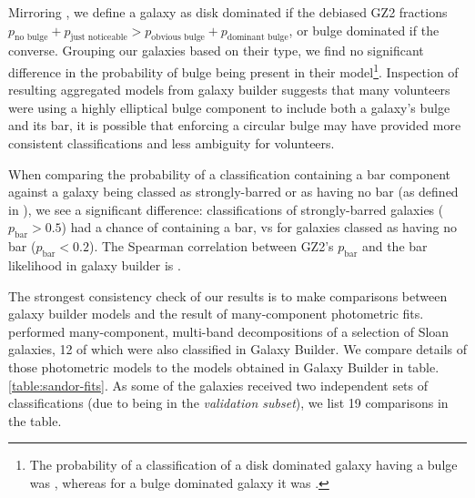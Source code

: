 \documentclass[../main.tex]{subfiles}
\begin{document}
Mirroring \citet{Kruk2017:1710.00093v2}, we define a galaxy as disk dominated if the debiased GZ2 fractions $p_\text{no bulge} + p_\text{just noticeable} > p_\text{obvious bulge} + p_\text{dominant bulge}$, or bulge dominated if the converse. Grouping our galaxies based on their type, we find no significant difference in the probability of bulge being present in their model\footnote{The probability of a classification of a disk dominated galaxy having a bulge was , whereas for a bulge dominated galaxy it was .}. Inspection of resulting aggregated models from galaxy builder suggests that many volunteers were using a highly elliptical bulge component to include both a galaxy's bulge and its bar, it is possible that enforcing a circular bulge may have provided more consistent classifications and less ambiguity for volunteers.

When comparing the probability of a classification containing a bar component against a galaxy being classed as strongly-barred or as having no bar (as defined in \citealt{Masters2010:1003.0449v2}), we see a significant difference: classifications of strongly-barred galaxies ($p_\text{bar} > 0.5$) had a  chance of containing a bar, vs  for galaxies classed as having no bar ($p_\text{bar} < 0.2$). The Spearman correlation between GZ2's $p_\text{bar}$ and the bar likelihood in galaxy builder is .

The strongest consistency check of our results is to make comparisons between galaxy builder models and the result of many-component photometric fits. \citet{Kruk2017:1710.00093v2} performed many-component, multi-band decompositions of a selection of Sloan galaxies, 12 of which were also classified in Galaxy Builder. We compare details of those photometric models to the models obtained in Galaxy Builder in table.\ref{table:sandor-fits}. As some of the galaxies received two independent sets of classifications (due to being in the \textit{validation subset}), we list 19 comparisons in the table.

\end{document}
